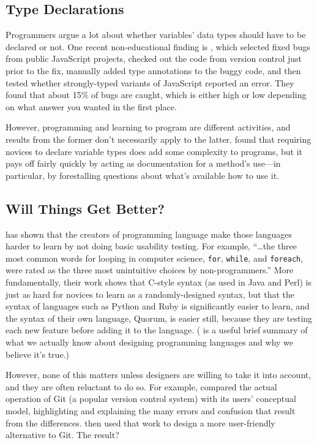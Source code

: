 \subsection*{Type Declarations}

Programmers argue a lot about whether variables' data types should
have to be declared or not.  One recent non-educational finding is
\cite{Gao2017}, which selected fixed bugs from public JavaScript
projects, checked out the code from version control just prior to the
fix, manually added type annotations to the buggy code, and then
tested whether strongly-typed variants of JavaScript reported an
error.  They found that about 15\% of bugs are caught, which is either
high or low depending on what answer you wanted in the first place.

However, programming and learning to program are different activities,
and results from the former don't necessarily apply to the latter.
\cite{Endr2014} found that requiring novices to declare variable types
does add some complexity to programs, but it pays off fairly quickly
by acting as documentation for a method's use---in particular, by
forestalling questions about what's available how to use it.

\subsection*{Will Things Get Better?}

\cite{Stef2013} has shown that the creators of programming language
make those languages harder to learn by not doing basic usability
testing.  For example, ``{\ldots}the three most common words for
looping in computer science, \texttt{for}, \texttt{while}, and
\texttt{foreach}, were rated as the three most unintuitive choices by
non-programmers.''  More fundamentally, their work shows that C-style
syntax (as used in Java and Perl) is just as hard for novices to learn
as a randomly-designed syntax, but that the syntax of languages such
as Python and Ruby is significantly easier to learn, and the syntax of
their own language, Quorum, is easier still, because they are testing
each new feature before adding it to the language. (\cite{Stef2017} is
a useful brief summary of what we actually know about designing
programming languages and why we believe it's true.)

However, none of this matters unless designers are willing to take it
into account, and they are often reluctant to do so.  For example,
\cite{Pere2013} compared the actual operation of Git (a popular
version control system) with its users' conceptual model, highlighting
and explaining the many errors and confusion that result from the
differences.  \cite{Pere2016} then used that work to design a more
user-friendly alternative to Git.  The result?

